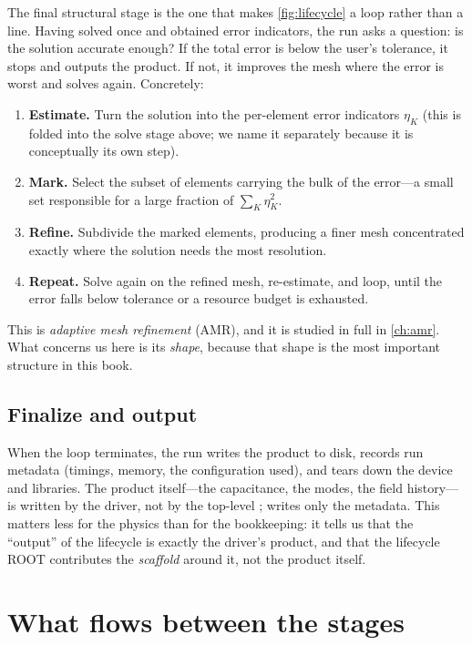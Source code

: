 The final structural stage is the one that makes \cref{fig:lifecycle} a loop
rather than a line. Having solved once and obtained error indicators, the run
asks a question: is the solution accurate enough? If the total error is below the
user's tolerance, it stops and outputs the product. If not, it improves the mesh
where the error is worst and solves again. Concretely:

\begin{enumerate}[nosep]
  \item \textbf{Estimate.} Turn the solution into the per-element error
  indicators $\eta_K$ (this is folded into the solve stage above; we name it
  separately because it is conceptually its own step).
  \item \textbf{Mark.} Select the subset of elements carrying the bulk of the
  error---a small set responsible for a large fraction of $\sum_K \eta_K^2$.
  \item \textbf{Refine.} Subdivide the marked elements, producing a finer mesh
  concentrated exactly where the solution needs the most resolution.
  \item \textbf{Repeat.} Solve again on the refined mesh, re-estimate, and loop,
  until the error falls below tolerance or a resource budget is exhausted.
\end{enumerate}

This is \emph{adaptive mesh refinement} (AMR), and it is studied in full in
\cref{ch:amr}. What concerns us here is its \emph{shape}, because that shape is
the most important structure in this book.

\subsection{Finalize and output}

When the loop terminates, the run writes the product to disk, records run
metadata (timings, memory, the configuration used), and tears down the device
and libraries. The product itself---the capacitance, the modes, the field
history---is written by the driver, not by the top-level ; 
writes only the metadata. This matters less for the physics than for the
bookkeeping: it tells us that the ``output'' of the lifecycle is exactly the
driver's product, and that the lifecycle ROOT contributes the \emph{scaffold}
around it, not the product itself.

\section{What flows between the stages}

